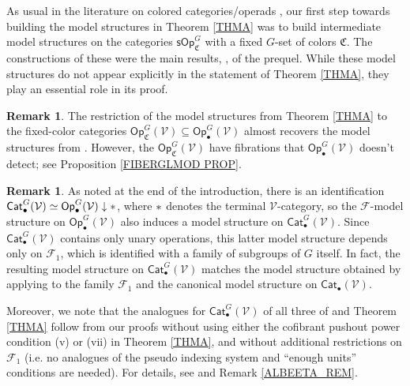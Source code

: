 \documentclass[a4paper,10pt
,draft
]{article}%
\numberwithin{equation}{section}
\numberwithin{figure}{section}
\theoremstyle{definition} %
\newtheorem{remark}[equation]{Remark}%
\newcommand{\Cat}{\mathsf{Cat}}
\newcommand{\Op}{\mathsf{Op}}%
\newcommand{\F}{\ensuremath{\mathcal F}}
\newcommand{\V}{\ensuremath{\mathcal V}}
\newcommand{\1}{\ensuremath{\mathbbm 1}}%
\begin{document}
As usual in the literature on colored categories/operads
\cite{BM07,Rob11,CM13b,Cav},
our first step towards building the model structures 
in Theorem \ref{THMA}
was to build intermediate model structures on the categories
$\mathsf{sOp}^G_{\mathfrak{C}}$
with a fixed $G$-set of colors $\mathfrak{C}$.
The constructions of these were the main results, \cite[Thms \ref{OC-THMI}, \ref{OC-THMII}]{BP_FCOP}, of the prequel.
While these model structures do not appear explicitly in the statement of Theorem \ref{THMA},
they play an essential role in its proof.

\begin{remark}
        The restriction of the model structures from Theorem \ref{THMA}
        to the fixed-color categories $\Op_{\mathfrak C}^G(\V) \subseteq \Op_\bullet^G(\V)$
        almost recovers the model structures from \cite[Thms. \ref{OC-THMI},\ref{OC-THMII}]{BP_FCOP}.
        However, the $\Op_{\mathfrak C}^G(\V)$ have fibrations that $\Op_\bullet^G(\V)$ doesn't detect; see Proposition \ref{FIBERGLMOD PROP}.
\end{remark}







\begin{remark}\label{RESTTOCATS REM}
	As noted at the end of the introduction, 
	there is an identification
	$\Cat_\bullet^G(\V) \simeq \Op_\bullet^G(\V) \downarrow \**$,
	where $\**$ denotes the terminal $\V$-category,
	so the $\F$-model structure on $\Op_\bullet^G(\V)$
	also induces a model structure on $\Cat_\bullet^G(\V)$.
	Since $\Cat_\bullet^G(\V)$ contains only unary operations,
	this latter model structure depends only on $\F_1$,
	which is identified with a family of subgroups of $G$ itself.
	In fact, the resulting model structure on 
	$\Cat_\bullet^G(\V)$ matches the model structure 
	obtained by applying \cite{Ste16}
	to the family $\F_1$ and the canonical model structure on
	$\Cat_\bullet(\V)$.
	

	Moreover, we note that the analogues for $\Cat_\bullet^G(\V)$
	of all three of \cite[Thms. \ref{OC-THMI} and \ref{OC-THMII}]{BP_FCOP} and Theorem \ref{THMA}
	follow from our proofs without using either
	the cofibrant pushout power condition (v)
	or (vii) in Theorem \ref{THMA},
	and without additional restrictions on $\F_1$
	(i.e. no analogues of the  pseudo indexing system and ``enough units'' conditions are needed).
	For details, see \cite[Rem. \ref{OC-CSPNTHI REM}]{BP_FCOP} and
	Remark \ref{ALBEETA_REM}.
\end{remark}
\end{document}
